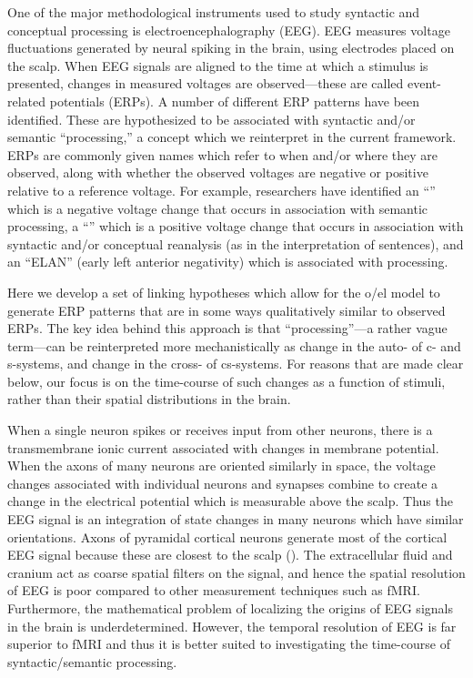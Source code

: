 One of the major methodological instruments used to study syntactic and conceptual processing is electroencephalography (EEG). EEG measures voltage fluctuations generated by neural spiking in the brain, using electrodes placed on the scalp. When EEG signals are aligned to the time at which a stimulus is presented, changes in measured voltages are observed—these are called event-related potentials (ERPs). A number of different ERP patterns have been identified. These are hypothesized to be associated with syntactic and/or semantic “processing,” a concept which we reinterpret in the current framework. ERPs are commonly given names which refer to when and/or where they are observed, along with whether the observed voltages are negative or positive relative to a reference voltage. For example, researchers have identified an “” which is a negative voltage change that occurs in association with semantic processing, a “” which is a positive voltage change that occurs in association with syntactic and/or conceptual reanalysis (as in the interpretation of  sentences), and an “ELAN” (early left anterior negativity) which is associated with  processing. 

Here we develop a set of linking hypotheses which allow for the o/el model to generate ERP patterns that are in some ways qualitatively similar to observed ERPs. The key idea behind this approach is that “processing”—a rather vague term—can be reinterpreted more mechanistically as change in the auto- of c- and s-systems, and change in the cross- of cs-systems. For reasons that are made clear below, our focus is on the time-course of such changes as a function of stimuli, rather than their spatial distributions in the brain.

When a single neuron spikes or receives input from other neurons, there is a transmembrane ionic current associated with changes in membrane potential. When the axons of many neurons are oriented similarly in space, the voltage changes associated with individual neurons and synapses combine to create a change in the electrical potential which is measurable above the scalp. Thus the EEG signal is an integration of state changes in many neurons which have similar orientations. Axons of pyramidal cortical neurons generate most of the cortical EEG signal because these are closest to the scalp (\citealt{FedermeierLaszlo2009,KutasDale1997}). The extracellular fluid and cranium act as coarse spatial filters on the signal, and hence the spatial resolution of EEG is poor compared to other measurement techniques such as fMRI. Furthermore, the mathematical problem of localizing the origins of EEG signals in the brain is underdetermined. However, the temporal resolution of EEG is far superior to fMRI and thus it is better suited to investigating the time-course of syntactic/semantic processing. 

